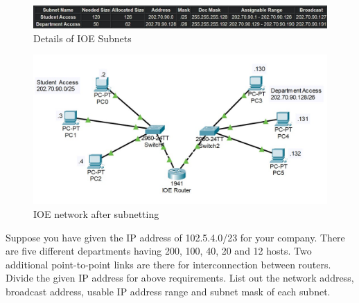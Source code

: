 \documentclass[a4paper,11pt]{article}
\begin{document}
\begin{A}
{        \begin{figure}[H]
            \centering
            \includegraphics[scale=0.7,cframe=blue 0.5pt 3pt]{./SubTab.jpg}
            \caption{Details of IOE Subnets}
        \end{figure}


        \begin{figure}[H]
            \centering
            \includegraphics[scale=0.75,cframe=blue 0.5pt 3pt]{./IOEA.jpg}
            \caption{IOE network after subnetting}
        \end{figure}
    }
\end{A}


\begin{Q}
    {
        Suppose you have given the IP address of 102.5.4.0/23 for your company. There are five
        different departments having 200, 100, 40, 20 and 12 hosts. Two additional point-to-point
        links are there for interconnection between routers. Divide the given IP address for above
        requirements. List out the network address, broadcast address, usable IP address range and
        subnet mask of each subnet.
    }
\end{Q}
\end{document}
